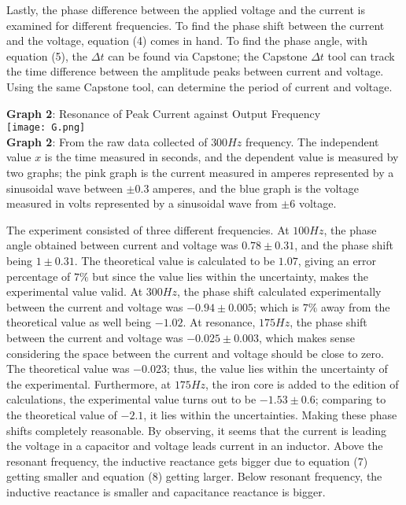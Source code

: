 \documentclass[11pt]{article}
\begin{document}
Lastly, the phase difference between the applied voltage and the current is examined for different frequencies. To find the phase shift between the current and the voltage, equation (4) comes in hand. To find the phase angle, with equation (5), the $\Delta t$ can be found via Capstone; the Capstone $\Delta t$ tool can track the time difference between the amplitude peaks between current and voltage. Using the same Capstone tool, can determine the period of current and voltage.
\newpage
\begin{center}
    \textbf{Graph 2}: Resonance of Peak Current against Output Frequency\\
    \texttt{[image: G.png]}\\\textbf{Graph 2}: From the raw data collected of $300Hz$ frequency. The independent value $x$ is the time measured in seconds, and the dependent value is measured by two graphs; the pink graph is the current measured in amperes represented by a sinusoidal wave between $\pm0.3$ amperes, and the blue graph is the voltage measured in volts represented by a sinusoidal wave from $\pm6$ voltage. 
\end{center}
The experiment consisted of three different frequencies. At $100Hz$, the phase angle obtained between current and voltage was $0.78\pm 0.31$, and the phase shift being $1\pm 0.31$. The theoretical value is calculated to be $1.07$, giving an error percentage of $7\%$ but since the value lies within the uncertainty, makes the experimental value valid. At $300Hz$, the phase shift calculated experimentally between the current and voltage was $-0.94\pm0.005$; which is $7\%$ away from the theoretical value as well being $-1.02$. At resonance, $175Hz$, the phase shift between the current and voltage was $-0.025\pm0.003$, which makes sense considering the space between the current and voltage should be close to zero. The theoretical value was $-0.023$; thus, the value lies within the uncertainty of the experimental. Furthermore, at $175Hz$, the iron core is added to the edition of calculations, the experimental value turns out to be $-1.53\pm0.6$; comparing to the theoretical value of $-2.1$, it lies within the uncertainties. Making these phase shifts completely reasonable. By observing, it seems that the current is leading the voltage in a capacitor and voltage leads current in an inductor. Above the resonant frequency, the inductive reactance gets bigger due to equation (7) getting smaller and equation (8) getting larger. Below resonant frequency, the inductive reactance is smaller and capacitance reactance is bigger. 
\end{document}
